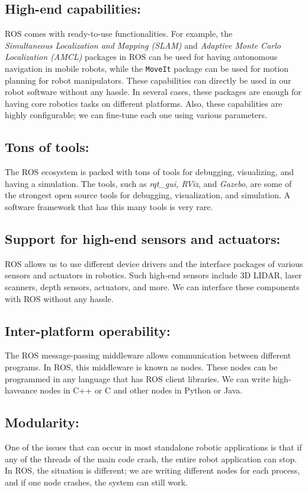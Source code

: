 \documentclass[../../main]{subfiles}
\begin{document}
\subsection{High-end capabilities:}ROS comes with ready-to-use functionalities. For example,
    the \\\emph{Simultaneous Localization and Mapping (SLAM)} and \emph{Adaptive Monte
    Carlo Localization (AMCL)} packages in ROS can be used for having autonomous
    navigation in mobile robots, while the \lstinline!MoveIt! package can be used for motion
    planning for robot manipulators. These capabilities can directly be used in our
    robot software without any hassle. In several cases, these packages are enough for
    having core robotics tasks on different platforms. Also, these capabilities are highly
    configurable; we can fine-tune each one using various parameters.
\subsection{Tons of tools:} The ROS ecosystem is packed with tons of tools for debugging,
    visualizing, and having a simulation. The tools, such as \emph{rqt\_gui, RViz}, and \emph{Gazebo},
    are some of the strongest open source tools for debugging, visualization, and
    simulation. A software framework that has this many tools is very rare.
\subsection{Support for high-end sensors and actuators:} ROS allows us to use different device
    drivers and the interface packages of various sensors and actuators in robotics. Such
    high-end sensors include 3D LIDAR, laser scanners, depth sensors, actuators, and
    more. We can interface these components with ROS without any hassle.
\subsection{Inter-platform operability:} The ROS message-passing middleware allows
    communication between different programs. In ROS, this middleware is known
    as nodes. These nodes can be programmed in any language that has ROS client
    libraries. We can write high-haveance nodes in C++ or C and other nodes in Python
    or Java.
\subsection{Modularity:}One of the issues that can occur in most standalone robotic
    applications is that if any of the threads of the main code crash, the entire robot
    application can stop. In ROS, the situation is different; we are writing different
    nodes for each process, and if one node crashes, the system can still work.
\end{document}
